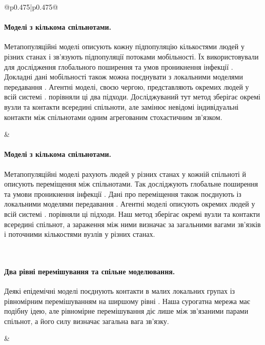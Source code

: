 ﻿\documentclass[11pt]{article}
\begin{document}
\begin{longtable}{@{}p{0.475\textwidth}|p{0.475\textwidth}@{}}
\begin{minipage}[t]{\linewidth}
\paragraph{Моделі з кількома спільнотами.}
Метапопуляційні моделі описують кожну підпопуляцію кількостями людей у різних станах і зв'язують підпопуляції потоками мобільності. Їх використовували для дослідження глобального поширення та умов проникнення інфекції \citep{colizza2007reaction,colizza2008,balcan2009,balcan2010modeling}. Докладні дані мобільності також можна поєднувати з локальними моделями передавання \citep{chang2021}. Агентні моделі, своєю чергою, представляють окремих людей у всій системі \citep{eubank2004,kerr2021}. \citet{ajelli2010} порівняли ці два підходи. Досліджуваний тут метод зберігає окремі вузли та контакти всередині спільноти, але замінює невідомі індивідуальні контакти між спільнотами одним агрегованим стохастичним зв'язком.
\end{minipage} &
\begin{minipage}[t]{\linewidth}
\paragraph{Моделі з кількома спільнотами.}
Метапопуляційні моделі рахують людей у різних станах у кожній спільноті й описують переміщення між спільнотами. Так досліджують глобальне поширення та умови проникнення інфекції \citep{colizza2007reaction,colizza2008,balcan2009,balcan2010modeling}. Дані про переміщення також поєднують із локальними моделями передавання \citep{chang2021}. Агентні моделі описують окремих людей у всій системі \citep{eubank2004,kerr2021}. \citet{ajelli2010} порівняли ці підходи. Наш метод зберігає окремі вузли та контакти всередині спільнот, а зараження між ними визначає за загальними вагами зв'язків і поточними кількостями вузлів у різних станах.
\end{minipage} \\[5mm]
\begin{minipage}[t]{\linewidth}
\paragraph{Два рівні перемішування та спільне моделювання.}
Деякі епідемічні моделі поєднують контакти в малих локальних групах із рівномірним перемішуванням на ширшому рівні \citep{ball1997}. Наша сурогатна мережа має подібну ідею, але рівномірне перемішування діє лише між зв'язаними парами спільнот, а його силу визначає загальна вага зв'язку.
\end{minipage} &
\begin{minipage}[t]{\linewidth}

\end{minipage}
\end{longtable}
\end{document}
